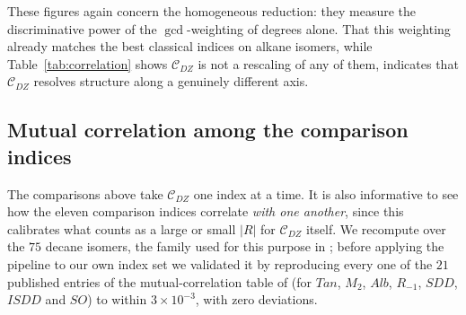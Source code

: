 \documentclass[11pt,a4paper]{article}
\theoremstyle{plain}
\theoremstyle{definition}
\theoremstyle{remark}
\newcommand{\CDZ}{\mathcal{C}_{DZ}}
\newcommand{\gcdd}{\operatorname{gcd}}
\begin{document}
These figures again concern the homogeneous reduction: they measure the
discriminative power of the $\gcdd$-weighting of degrees alone. That this
weighting already matches the best classical indices on alkane isomers, while
Table~\ref{tab:correlation} shows $\CDZ$ is not a rescaling of any of them,
indicates that $\CDZ$ resolves structure along a genuinely different axis.

\subsection{Mutual correlation among the comparison indices}
\label{sec:mutual}

The comparisons above take $\CDZ$ one index at a time. It is also informative to
see how the eleven comparison indices correlate \emph{with one another}, since
this calibrates what counts as a large or small $|R|$ for $\CDZ$ itself. We
recompute over the $75$ decane isomers, the family used for this purpose in
\cite{oz2025}; before applying the pipeline to our own index set we validated it
by reproducing every one of the $21$ published entries of the mutual-correlation
table of \cite{oz2025} (for $Tan$, $M_2$, $Alb$, $R_{-1}$, $SDD$, $ISDD$ and
$SO$) to within $3\times10^{-3}$, with zero deviations.
\end{document}
